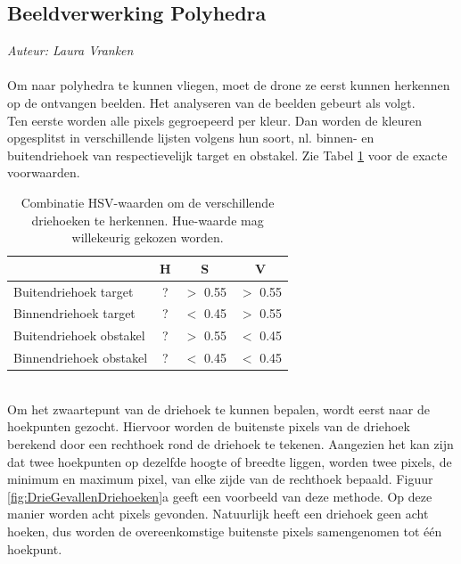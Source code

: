 \subsection{Beeldverwerking Polyhedra}
{\em Auteur: Laura Vranken}
\\
\\
\noindent
Om naar polyhedra te kunnen vliegen, moet de drone ze eerst kunnen herkennen op de ontvangen beelden. Het analyseren van de beelden gebeurt als volgt. 
\\
Ten eerste worden alle pixels gegroepeerd per kleur. Dan worden de kleuren opgesplitst in verschillende lijsten volgens hun soort, nl. binnen- en buitendriehoek van respectievelijk target en obstakel. Zie Tabel \ref{table: HSVwaarden} voor de exacte voorwaarden.
\begin{table}[h]
	\centering
\begin{tabular}{ l | c | c | c }
	 & H & S & V\\\hline
	Buitendriehoek target & ? & \(>\) 0.55 & \(>\) 0.55 \\
	Binnendriehoek target & ? & \(<\) 0.45 & \(>\) 0.55 \\
	Buitendriehoek obstakel & ? & \(>\) 0.55 & \(<\) 0.45 \\
	Binnendriehoek obstakel & ? & \(<\) 0.45 & \(<\) 0.45\\
\end{tabular}
\caption{\label{table: HSVwaarden}Combinatie HSV-waarden om de verschillende driehoeken te herkennen. Hue-waarde mag willekeurig gekozen worden.}
\end{table}
\\
Om het zwaartepunt van de driehoek te kunnen bepalen, wordt eerst naar de hoekpunten gezocht. Hiervoor worden de buitenste pixels van de driehoek berekend door een rechthoek rond de driehoek te tekenen. Aangezien het kan zijn dat twee hoekpunten op dezelfde hoogte of breedte liggen, worden twee pixels, de minimum en maximum pixel, van elke zijde van de rechthoek bepaald. Figuur \ref{fig:DrieGevallenDriehoeken}a geeft een voorbeeld van deze methode. Op deze manier worden acht pixels gevonden. Natuurlijk heeft een driehoek geen acht hoeken, dus worden de overeenkomstige buitenste pixels samengenomen tot één hoekpunt. 
